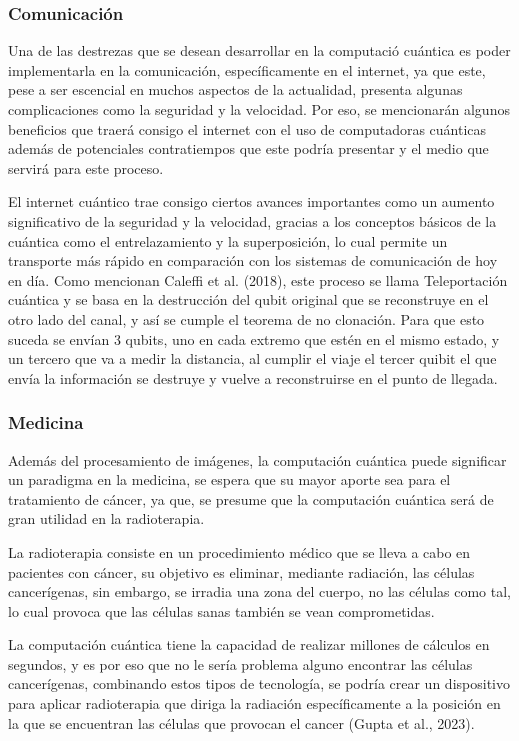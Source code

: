\documentclass[twoside]{article}
\begin{document}
\subsubsection{Comunicación}
Una de las destrezas que se desean desarrollar en la computació cuántica es poder implementarla en la comunicación, específicamente en el internet, ya que este, pese a ser escencial en muchos aspectos de la actualidad, presenta algunas complicaciones como la seguridad y la velocidad. Por eso, se mencionarán algunos beneficios que traerá consigo el internet con el uso de computadoras cuánticas además de potenciales contratiempos que este podría presentar y el medio que servirá para este proceso.

El internet cuántico trae consigo ciertos avances importantes como un aumento significativo de la seguridad y la velocidad, gracias a los conceptos básicos de la cuántica como el entrelazamiento y la superposición, lo cual permite un transporte más rápido en comparación con los sistemas de comunicación de hoy en día. Como mencionan Caleffi et al. (2018), este proceso se llama Teleportación cuántica y se basa en la destrucción del qubit original que se reconstruye en el otro lado del canal, y así se cumple el teorema de no clonación. Para que esto suceda se envían 3 qubits, uno en cada extremo que estén en el mismo estado, y un tercero que va a medir la distancia, al cumplir el viaje el tercer quibit el que envía la información se destruye y vuelve a reconstruirse en el punto de llegada. 
\subsubsection{Medicina}
Además del procesamiento de imágenes, la computación cuántica puede significar un paradigma en la medicina, se espera que su mayor aporte sea para el tratamiento de cáncer, ya que, se presume que la computación cuántica será de gran utilidad en la radioterapia.

La radioterapia consiste en un procedimiento médico que se lleva a cabo en pacientes con cáncer, su objetivo es eliminar, mediante radiación, las células cancerígenas, sin embargo, se irradia una zona del cuerpo, no las células como tal, lo cual provoca que las células sanas también se vean comprometidas. 

La computación cuántica tiene la capacidad de realizar millones de cálculos en segundos, y es por eso que no le sería problema alguno encontrar las células cancerígenas, combinando estos tipos de tecnología, se podría crear un dispositivo para aplicar radioterapia que diriga la radiación específicamente a la posición en la que se encuentran las células que provocan el cancer (Gupta et al., 2023).
\end{document}
